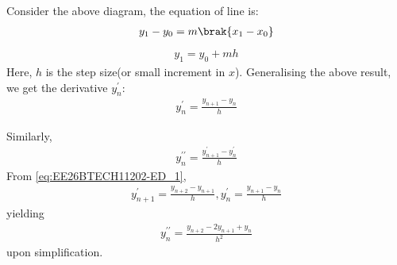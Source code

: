 \begin{enumerate}[label=\thesubsection.\arabic*, ref=\thesubsection.\theenumi]
\begin{itemize}
\begin{figure}[H]
\begin{center}
\end{center}
\end{figure}
Consider the above diagram, the equation of line is:
\begin{align}
	y_1-y_0=m\brak{x_1-x_0}
\end{align}
\begin{align}
y_1=y_0+mh
\end{align}
Here, $h$ is the step size(or small increment in $x$). Generalising the above result, we get the derivative $y^{\prime}_n$:
\begin{align}
	y^{\prime}_n=\frac{y_{n+1}-y_n}{h} \label{eq:EE26BTECH11202-ED_1}
\end{align}
\end{itemize}
\fi
Similarly,
\begin{align}
	y_n^{\prime \prime}=\frac{y_{n+1}^{\prime}-y_n^{\prime}}{h}
\end{align}
		From \eqref{eq:EE26BTECH11202-ED_1}, 
		\begin{align}
			y_{n+1}^{\prime}=\frac{y_{n+2}-y_{n+1}}{h}, y_n^{\prime}=\frac{y_{n+1}-y_n}{h}
		\end{align}
		yielding
\begin{align}
	y_n^{\prime \prime}=\frac{y_{n+2}-2y_{n+1}+y_n}{h^2} \label{eq:EE26BTECH11202-ED_2}
\end{align}
upon simplification.


\end{enumerate}
